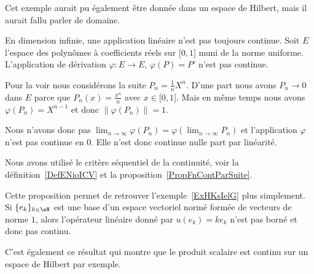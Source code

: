 Cet exemple aurait pu également être donnée dans un espace de Hilbert, mais il aurait fallu parler de domaine.


\begin{example}      \label{EXooDMVJooAJywMU}
    En dimension infinie, une application linéaire n'est pas toujours continue. Soit \( E\) l'espace des polynômes à coefficients réels sur \( \mathopen[ 0 , 1 \mathclose]\) muni de la norme uniforme. L'application de dérivation \( \varphi\colon E\to E\), \( \varphi(P)=P'\) n'est pas continue.

    Pour la voir nous considérons la suite \( P_n=\frac{1}{ n }X^n\). D'une part nous avons \( P_n\to 0\) dans \( E\) parce que \( P_n(x)=\frac{ x^n }{ n }\) avec \( x\in \mathopen[ 0 , 1 \mathclose]\). Mais en même temps nous avons \( \varphi(P_n)=X^{n-1}\) et donc \( \| \varphi(P_n) \|=1\).

    Nous n'avons donc pas \( \lim_{n\to \infty} \varphi(P_n)=\varphi(\lim_{n\to \infty} P_n)\) et l'application \( \varphi\) n'est pas continue en \( 0\). Elle n'est donc continue nulle part par linéarité.

    Nous avons utilisé le critère séquentiel de la continuité, voir la définition~\ref{DefENioICV} et la proposition~\ref{PropFnContParSuite}.
\end{example}

\begin{remark}  \label{RemOAXNooSMTDuN}
Cette proposition permet de retrouver l'exemple~\ref{ExHKsIelG} plus simplement. Si \( \{ e_k \}_{k\in \eN}\) est une base d'un espace vectoriel normé formée de vecteurs de norme \( 1\), alors l'opérateur linéaire donné par \( u(e_k)=ke_k\) n'est pas borné et donc pas continu.
\end{remark}

C'est également ce résultat qui montre que le produit scalaire est continu sur un espace de Hilbert par exemple.


